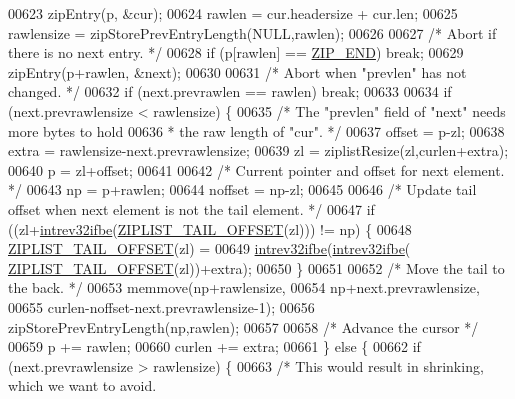 \begin{DoxyCode}
{{00623         zipEntry(p, &cur);
00624         rawlen = cur.headersize + cur.len;
00625         rawlensize = zipStorePrevEntryLength(NULL,rawlen);
00626 
00627         \textcolor{comment}{/* Abort if there is no next entry. */}
00628         \textcolor{keywordflow}{if} (p[rawlen] == \hyperlink{ziplist_8c_a31a8f9d5b5bad75318741cfca5de5ea8}{ZIP\_END}) \textcolor{keywordflow}{break};
00629         zipEntry(p+rawlen, &next);
00630 
00631         \textcolor{comment}{/* Abort when "prevlen" has not changed. */}
00632         \textcolor{keywordflow}{if} (next.prevrawlen == rawlen) \textcolor{keywordflow}{break};
00633 
00634         \textcolor{keywordflow}{if} (next.prevrawlensize < rawlensize) \{
00635             \textcolor{comment}{/* The "prevlen" field of "next" needs more bytes to hold}
00636 \textcolor{comment}{             * the raw length of "cur". */}
00637             offset = p-zl;
00638             extra = rawlensize-next.prevrawlensize;
00639             zl = ziplistResize(zl,curlen+extra);
00640             p = zl+offset;
00641 
00642             \textcolor{comment}{/* Current pointer and offset for next element. */}
00643             np = p+rawlen;
00644             noffset = np-zl;
00645 
00646             \textcolor{comment}{/* Update tail offset when next element is not the tail element. */}
00647             \textcolor{keywordflow}{if} ((zl+\hyperlink{endianconv_8h_a4e85d9ae58a3b1e6ceaabfd4689002c7}{intrev32ifbe}(\hyperlink{ziplist_8c_adf2235d74c81861c85fb5d2ffa209397}{ZIPLIST\_TAIL\_OFFSET}(zl))) != np) \{
00648                 \hyperlink{ziplist_8c_adf2235d74c81861c85fb5d2ffa209397}{ZIPLIST\_TAIL\_OFFSET}(zl) =
00649                     \hyperlink{endianconv_8h_a4e85d9ae58a3b1e6ceaabfd4689002c7}{intrev32ifbe}(\hyperlink{endianconv_8h_a4e85d9ae58a3b1e6ceaabfd4689002c7}{intrev32ifbe}(
      \hyperlink{ziplist_8c_adf2235d74c81861c85fb5d2ffa209397}{ZIPLIST\_TAIL\_OFFSET}(zl))+extra);
00650             \}
00651 
00652             \textcolor{comment}{/* Move the tail to the back. */}
00653             memmove(np+rawlensize,
00654                 np+next.prevrawlensize,
00655                 curlen-noffset-next.prevrawlensize-1);
00656             zipStorePrevEntryLength(np,rawlen);
00657 
00658             \textcolor{comment}{/* Advance the cursor */}
00659             p += rawlen;
00660             curlen += extra;
00661         \} \textcolor{keywordflow}{else} \{
00662             \textcolor{keywordflow}{if} (next.prevrawlensize > rawlensize) \{
00663                 \textcolor{comment}{/* This would result in shrinking, which we want to avoid.}
}}
\end{DoxyCode}
